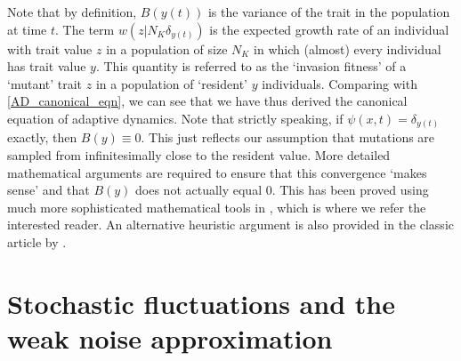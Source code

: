 Note that by definition, $B(y(t))$ is the variance of the trait in the population at time $t$. The term $w\left(z|N_K\delta_{y(t)}\right)$ is the expected growth rate of an individual with trait value $z$ in a population of size $N_K$ in which (almost) every individual has trait value $y$. This quantity is referred to as the `invasion fitness' of a `mutant' trait $z$ in a population of `resident' $y$ individuals. Comparing with \eqref{AD_canonical_eqn}, we can see that we have thus derived the canonical equation of adaptive dynamics. Note that strictly speaking, if $\psi(x,t) = \delta_{y(t)}$ exactly, then $B(y) \equiv 0$. This just reflects our assumption that mutations are sampled from infinitesimally close to the resident value. More detailed mathematical arguments are required to ensure that this convergence `makes sense' and that $B(y)$ does not actually equal 0. This has been proved using much more sophisticated mathematical tools in \citep{champagnat_unifying_2006}, which is where we refer the interested reader. An alternative heuristic argument is also provided in the classic article by \citep{dieckmann_dynamical_1996}.

\section{Stochastic fluctuations and the weak noise approximation}

